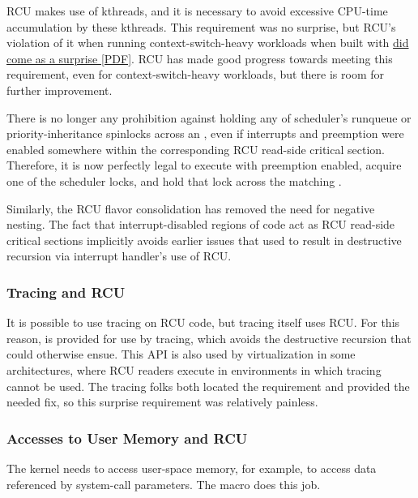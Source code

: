 RCU makes use of kthreads, and it is necessary to avoid excessive CPU-time
accumulation by these kthreads.
This requirement was no surprise, but
RCU's violation of it when running context-switch-heavy workloads when
built with 
\href{http://www.rdrop.com/users/paulmck/scalability/paper/BareMetal.2015.01.15b.pdf}{did come as a surprise [PDF]}.
RCU has made good progress towards meeting this requirement, even for
context-switch-heavy  workloads, but there is
room for further improvement.

There is no longer any prohibition against holding any of
scheduler's runqueue or priority-inheritance spinlocks across an
, even if interrupts and preemption were enabled
somewhere within the corresponding RCU read-side critical section.
Therefore, it is now perfectly legal to execute 
with preemption enabled, acquire one of the scheduler locks, and hold
that lock across the matching .

Similarly, the RCU flavor consolidation has removed the need for negative
nesting.
The fact that interrupt-disabled regions of code act as RCU
read-side critical sections implicitly avoids earlier issues that used
to result in destructive recursion via interrupt handler's use of RCU\@.


\subsubsection{Tracing and RCU}

It is possible to use tracing on RCU code, but tracing itself uses RCU\@.
For this reason,  is provided for use
by tracing, which avoids the destructive recursion that could otherwise
ensue.
This API is also used by virtualization in some architectures,
where RCU readers execute in environments in which tracing cannot be
used.
The tracing folks both located the requirement and provided the
needed fix, so this surprise requirement was relatively painless.


\subsubsection{Accesses to User Memory and RCU}

The kernel needs to access user-space memory, for example, to access data
referenced by system-call parameters.
The  macro does this job.

